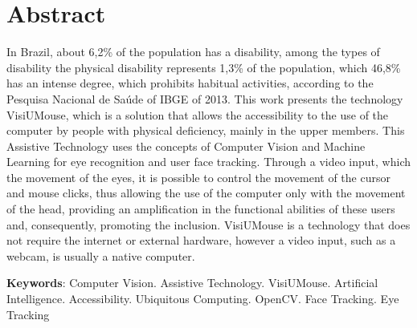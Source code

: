 \chapter*{Abstract}
\begin{singlespace}
{\fontsize{12pt}{\baselineskip} \selectfont \noindent
In Brazil, about 6,2\% of the population has a disability, among the types of disability the physical disability represents 1,3\% of the population, which 46,8\% has an intense degree, which prohibits habitual activities, according to the Pesquisa  Nacional de Saúde of IBGE of 2013. This work presents the technology VisiUMouse, which is a solution that allows the accessibility to the use of the computer by people with physical deficiency, mainly in the upper members. This Assistive Technology uses the concepts of Computer Vision and Machine Learning for eye recognition and user face tracking. Through a video input, which the movement of the eyes, it is possible to control the movement of the cursor and mouse clicks, thus allowing the use of the computer only with the movement of the head, providing an amplification in the functional abilities of these users and, consequently, promoting the inclusion. VisiUMouse is a technology that does not require the internet or external hardware, however a video input, such as a webcam, is usually a native computer.
}
\end{singlespace}

\begin{singlespace}
\noindent \onehalfspacing
\textbf{Keywords}: Computer Vision. Assistive Technology. VisiUMouse. Artificial Intelligence. Accessibility. Ubiquitous Computing. OpenCV. Face Tracking. Eye Tracking
\end{singlespace}